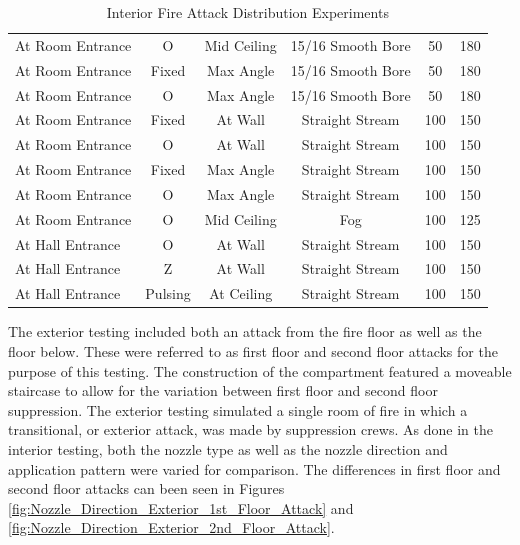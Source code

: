 \documentclass{article}
\begin{document}
\begin{table}[]
{\begin{tabular}{|lccccc|}
At Room Entrance & O & Mid Ceiling & 15/16 Smooth Bore & 50 & 180 \\
At Room Entrance & Fixed & Max Angle & 15/16 Smooth Bore & 50 & 180 \\
At Room Entrance & O & Max Angle & 15/16 Smooth Bore & 50 & 180 \\
At Room Entrance & Fixed & At Wall & Straight Stream & 100 & 150 \\
At Room Entrance & O & At Wall & Straight Stream & 100 & 150 \\
At Room Entrance & Fixed & Max Angle & Straight Stream & 100 & 150 \\
At Room Entrance & O & Max Angle & Straight Stream & 100 & 150 \\
At Room Entrance & O & Mid Ceiling & Fog & 100 & 125 \\
At Hall Entrance & O & At Wall & Straight Stream & 100 & 150 \\
At Hall Entrance & Z & At Wall & Straight Stream & 100 & 150 \\
At Hall Entrance & Pulsing & At Ceiling & Straight Stream & 100 & 150 \\ \hline
\end{tabular}}
\caption{Interior Fire Attack Distribution Experiments}
\label{Interior_Fire_Attack_Distribution_Experiments}
\end{table}

\clearpage

The exterior testing included both an attack from the fire floor as well as the floor below. These were referred to as first floor and second floor attacks for the purpose of this testing. The construction of the compartment featured a moveable staircase to allow for the variation between first floor and second floor suppression. The exterior testing simulated a single room of fire in which a transitional, or exterior attack, was made by suppression crews. As done in the interior testing, both the nozzle type as well as the nozzle direction and application pattern were varied for comparison. The differences in first floor and second floor attacks can been seen in Figures \ref{fig:Nozzle_Direction_Exterior_1st_Floor_Attack} and \ref{fig:Nozzle_Direction_Exterior_2nd_Floor_Attack}.
\end{document}
